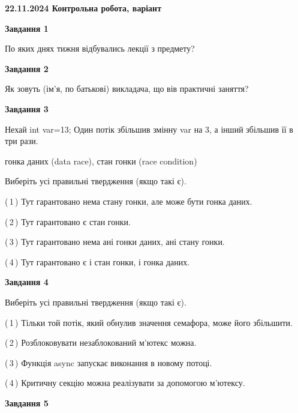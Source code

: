\documentclass[12pt, ukrainian]{article}
\begin{document}
\begin {large}

\textbf{22.11.2024 Контрольна робота, варіант  }\par


{

\begin{center}
\textbf{Завдання 1}
\end{center}

По яких днях тижня відбувались лекції з предмету?


\begin{center}
\textbf{Завдання 2}
\end{center}

Як зовуть (ім'я, по батькові) викладача, що вів практичні заняття?


\begin{center}
\textbf{Завдання 3}
\end{center}

Нехай int var=13; Один потік збільшив змінну var на 3, а інший збільшив її в три рази.

гонка даних (data race), стан гонки (race condition)

Виберіть усі правильні твердження (якщо такі є).\par
\vspace{2mm}
(\,1\,) Тут гарантовано нема стану гонки, але може бути гонка даних.%

(\,2\,) Тут гарантовано є стан гонки.%

(\,3\,) Тут гарантовано нема ані гонки даних, ані стану гонки.%

(\,4\,) Тут гарантовано є і стан гонки, і гонка даних.%


\begin{center}
\textbf{Завдання 4}
\end{center}

Виберіть усі правильні твердження (якщо такі є).\par
\vspace{2mm}

(\,1\,) Тільки той потік, який обнулив значення семафора, може його збільшити.%

(\,2\,) Розблоковувати незаблокований м’ютекс можна.%

(\,3\,) Функція async запускає виконання в новому потоці.%

(\,4\,) Критичну секцію можна реалізувати за допомогою м’ютексу.%


\begin{center}
\textbf{Завдання 5}
\end{center}

}
\end{large}
\end{document}

